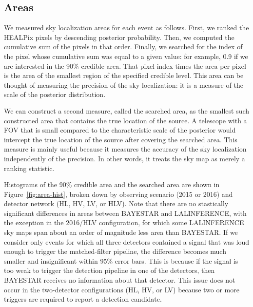\documentclass[amsmath,amssymb,aps,prx,reprint,nopreprintnumbers,nofootinbib,showpacs]{revtex4-1}
\begin{document}
\subsection{Areas}

We measured sky localization areas for each event as follows. First, we ranked the \ac{HEALPix} pixels by descending posterior probability. Then, we computed the cumulative sum of the pixels in that order. Finally, we searched for the index of the pixel whose cumulative sum was equal to a given value: for example, 0.9 if we are interested in the 90\% credible area. That pixel index times the area per pixel is the area of the smallest region of the specified credible level. This area can be thought of measuring the precision of the sky localization: it is a measure of the scale of the posterior distribution.

We can construct a second measure, called the searched area, as the smallest such constructed area that contains the true location of the source. A telescope with a \ac{FOV} that is small compared to the characteristic scale of the posterior would intercept the true location of the source after covering the searched area. This measure is mainly useful because it measures the accuracy of the sky localization independently of the precision. In other words, it treats the sky map as merely a ranking statistic.

Histograms of the 90\% credible area and the searched area are shown in Figure~\ref{fig:area-hist}, broken down by observing scenario (2015 or 2016) and detector network (HL, HV, LV, or HLV). Note that there are no stastically significant differences in areas between \ac{BAYESTAR} and LALINFERENCE, with the exception in the 2016/HLV configuration, for which some LALINFERENCE sky maps span about an order of magnitude less area than \ac{BAYESTAR}. If we consider only events for which all three detectors contained a signal that was loud enough to trigger the matched\nobreakdashes-filter pipeline, the difference becomes much smaller and insignificant within 95\% error bars. This is because if the signal is too weak to trigger the detection pipeline in one of the detectors, then \ac{BAYESTAR} receives no information about that detector. This issue does not occur in the two\nobreakdashes-detector configurations (HL, HV, or LV) because two or more triggers are required to report a detection candidate.
\end{document}

